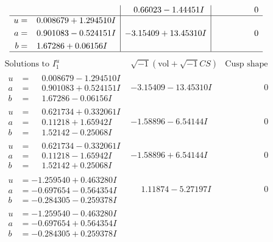 \documentclass[1p]{elsarticle_modified}
\theoremstyle{definition}
\newcommand{\I}{\sqrt{-1}}
\begin{document}
$$\begin{array}{c|c|c}
 & \phantom{-}0.66023 - 1.44451 I & \phantom{-0.000000 } 0 \\ \hline\begin{aligned}
u &= \phantom{-}0.008679 + 1.294510 I \\
a &= \phantom{-}0.901083 - 0.524151 I \\
b &= \phantom{-}1.67286 + 0.06156 I\end{aligned}
 & -3.15409 + 13.45310 I & \phantom{-0.000000 } 0\\
 \hline 
 \end{array}$$\newpage$$\begin{array}{c|c|c}  
\text{Solutions to }I^u_{1}& \I (\text{vol} + \sqrt{-1}CS) & \text{Cusp shape}\\
 \hline 
\begin{aligned}
u &= \phantom{-}0.008679 - 1.294510 I \\
a &= \phantom{-}0.901083 + 0.524151 I \\
b &= \phantom{-}1.67286 - 0.06156 I\end{aligned}
 & -3.15409 - 13.45310 I & \phantom{-0.000000 } 0 \\ \hline\begin{aligned}
u &= \phantom{-}0.621734 + 0.332061 I \\
a &= \phantom{-}0.11218 + 1.65942 I \\
b &= \phantom{-}1.52142 - 0.25068 I\end{aligned}
 & -1.58896 - 6.54144 I & \phantom{-0.000000 } 0 \\ \hline\begin{aligned}
u &= \phantom{-}0.621734 - 0.332061 I \\
a &= \phantom{-}0.11218 - 1.65942 I \\
b &= \phantom{-}1.52142 + 0.25068 I\end{aligned}
 & -1.58896 + 6.54144 I & \phantom{-0.000000 } 0 \\ \hline\begin{aligned}
u &= -1.259540 + 0.463280 I \\
a &= -0.697654 - 0.564354 I \\
b &= -0.284305 - 0.259378 I\end{aligned}
 & \phantom{-}1.11874 - 5.27197 I & \phantom{-0.000000 } 0 \\ \hline\begin{aligned}
u &= -1.259540 - 0.463280 I \\
a &= -0.697654 + 0.564354 I \\
b &= -0.284305 + 0.259378 I\end{aligned}

\end{array}$$
\end{document}
